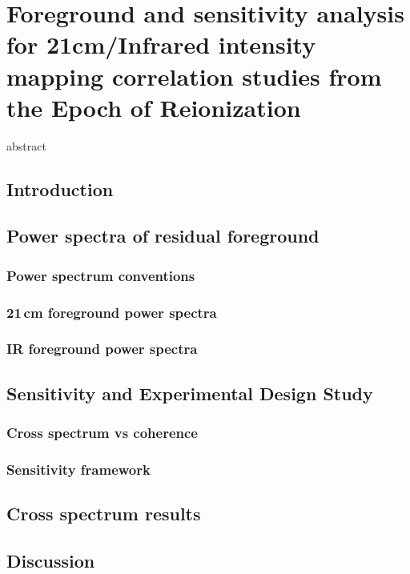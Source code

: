 \chapter{Foreground and sensitivity analysis for 21cm/Infrared intensity mapping correlation studies from the Epoch of Reionization}
\label{chap:xcor}

abstract

\section{Introduction}

\section{Power spectra of residual foreground}
\subsection{Power spectrum conventions}
\subsection{21\,cm foreground power spectra}
\subsection{IR foreground power spectra}

\section{Sensitivity and Experimental Design Study}
\subsection{Cross spectrum vs coherence}
\subsection{Sensitivity framework}

\section{Cross spectrum results}

\section{Discussion}

